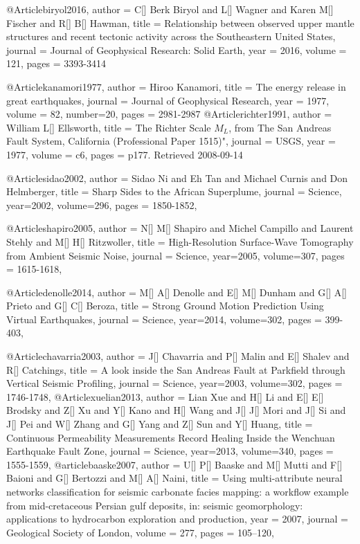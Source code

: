 @Article{biryol2016,
  author = 	 {C[] Berk Biryol and L[] Wagner and Karen M[] Fischer and R[] B[] Hawman},
  title = 	 {Relationship between observed upper mantle structures and recent tectonic activity across the Southeastern United States},
  journal = 	 {Journal of Geophysical Research: Solid Earth},
  year = 	 2016,
  volume = 121,
  pages =	 {3393-3414}
}

@Article{kanamori1977,
  author = 	 {Hiroo Kanamori},
  title = 	 {The energy release in great earthquakes},
  journal = 	 {Journal of Geophysical Research},
  year = 	 1977,
  volume = 82,
  number=20,
  pages =	 {2981-2987}
}
@Article{richter1991,
  author = 	 {William L[] Ellsworth},
  title = 	 {The Richter Scale $M_L$, from The San Andreas Fault System, California (Professional Paper 1515)"},
  journal = 	 {USGS},
  year = 	 1977,
  volume = c6,
  pages =	 {p177. Retrieved 2008-09-14}
}



@Article{sidao2002,
  author =	 {Sidao Ni and Eh Tan and Michael Curnis and Don Helmberger},
  title =	 {Sharp Sides to the African Superplume},
  journal =	 {Science},
  year=2002,
  volume=296,
  pages =	 {1850-1852},
}

@Article{shapiro2005,
  author =	 {N[] M[] Shapiro and Michel Campillo and Laurent Stehly and M[] H[] Ritzwoller},
  title =	 {High-Resolution Surface-Wave Tomography from Ambient Seismic Noise},
  journal =	 {Science},
  year=2005,
  volume=307,
  pages =	 {1615-1618},
}

@Article{denolle2014,
  author =	 {M[] A[] Denolle and E[] M[] Dunham and G[] A[] Prieto and G[] C[] Beroza},
  title =	 {Strong Ground Motion Prediction Using Virtual Earthquakes},
  journal =	 {Science},
  year=2014,
  volume=302,
  pages =	 {399-403},
}

@Article{chavarria2003,
  author =	 {J[] Chavarria and P[] Malin and E[] Shalev and R[] Catchings},
  title =	 {A look inside the San Andreas Fault at Parkfield through Vertical Seismic Profiling},
  journal =	 {Science},
  year=2003,
  volume=302,
  pages =	 {1746-1748},
}
@Article{xuelian2013,
  author =	 {Lian Xue and H[] Li and E[] E[] Brodsky and Z[] Xu and Y[] Kano and H[] Wang and J[] J[] Mori and J[] Si and J[] Pei and W[] Zhang and G[] Yang and Z[] Sun and Y[] Huang},
  title =	 {Continuous Permeability Measurements Record Healing Inside the Wenchuan Earthquake Fault Zone},
  journal =	 {Science},
  year=2013,
  volume=340,
  pages =	 {1555-1559},
}
@article{baaske2007,
author = {U[] P[] Baaske and M[] Mutti and F[] Baioni and G[] Bertozzi and M[] A[] Naini},
title = {Using multi-attribute neural networks classification for seismic carbonate facies mapping: a workflow example from mid-cretaceous Persian gulf deposits, in: seismic geomorphology: applications to hydrocarbon exploration and production},
year = {2007},
journal = {Geological Society of London},
volume = {277},
pages = {105–120},
}



